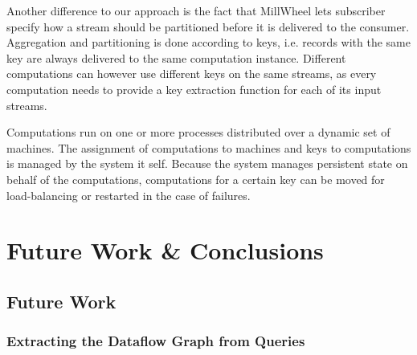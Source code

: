Another difference to our approach is the fact that MillWheel lets subscriber
specify how a stream should be partitioned before it is delivered to the consumer.
Aggregation and partitioning is done according to keys, i.e. records with the
same key are always delivered to the same computation instance. Different
computations can however use different keys on the same streams, as every computation
needs to provide a key extraction function for each of its input streams.

Computations run on one or more processes distributed over a dynamic set of
machines. The assignment of computations to machines and keys to computations
is managed by the system it self. Because the system manages persistent state
on behalf of the computations, computations for a certain key can be moved
for load-balancing or restarted in the case of failures.

\cleardoublepage
\chapter{Future Work \& Conclusions} \label{ch:conclusions}

\section{Future Work}



\subsection{Extracting the Dataflow Graph from Queries}

